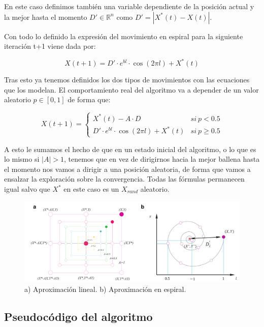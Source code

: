 \documentclass[12pt,a4paper]{article}
\begin{document}
		En este caso definimos también una variable dependiente de la posición actual y la mejor hasta el momento $D'\in \mathbb{R}^n$ como $D' = |X^*(t)-X(t)|$.
		
		Con todo lo definido la expresión del movimiento en espiral para la siguiente iteración t+1 viene dada por:
		
		$$X(t+1) = D'\cdot e^{bl}\cdot \cos(2\pi l) + X^*(t)$$
		
		Tras esto ya tenemos definidos los dos tipos de movimientos con las ecuaciones que los modelan. El comportamiento real del algoritmo va a depender de un valor aleatorio $p\in [0,1]$ de forma que:
		
		$$X(t+1) = 
		\begin{cases}
			X^*(t)-A\cdot D & si \ p<0.5\\
			D'\cdot e^{bl}\cdot \cos(2\pi l)+X^*(t) & si \ p\geq0.5
		\end{cases}$$
		
		A esto le sumamos el hecho de que en un estado inicial del algoritmo, o lo que es lo mismo si $|A|>1$, tenemos que en vez de dirigirnos hacia la mejor ballena hasta el momento nos vamos a dirigir a una posición aleatoria, de forma que vamos a ensalzar la exploración sobre la convergencia. Todas las fórmulas permanecen igual salvo que $X^*$ en este caso es un $X_{rand}$ aleatorio.
		
		\begin{figure}[!h]
			\includegraphics[scale=0.35]{./Imagenes/lineal_espiral.png}
			\caption{a) Aproximación lineal. b) Aproximación en espiral.}
		\end{figure}
		
	\subsection{Pseudocódigo del algoritmo}
	
\end{document}
